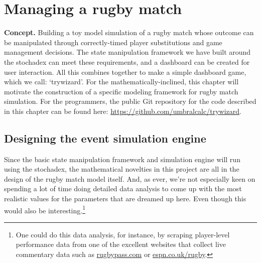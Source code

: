 \chapter{\sffamily Managing a rugby match}

{\bfseries\sffamily Concept.} Building a toy model simulation of a rugby match whose outcome can be manipulated through correctly-timed player substitutions and game management decisions. The state manipulation framework we have built around the stochadex can meet these requirements, and a dashboard can be created for user interaction. All this combines together to make a simple dashboard game, which we call: `trywizard'. For the mathematically-inclined, this chapter will motivate the construction of a specific modeling framework for rugby match simulation. For the programmers, the public Git repository for the code described in this chapter can be found here: \href{https://github.com/umbralcalc/trywizard}{https://github.com/umbralcalc/trywizard}.

\section{\sffamily Designing the event simulation engine}

Since the basic state manipulation framework and simulation engine will run using the stochadex, the mathematical novelties in this project are all in the design of the rugby match model itself. And, as ever, we're not especially keen on spending a lot of time doing detailed data analysis to come up with the most realistic values for the parameters that are dreamed up here. Even though this would also be interesting.\footnote{One could do this data analysis, for instance, by scraping player-level performance data from one of the excellent websites that collect live commentary data such as \href{https://www.rugbypass.com/}{rugbypass.com} or \href{https://www.espn.co.uk/rugby/}{espn.co.uk/rugby}.}

